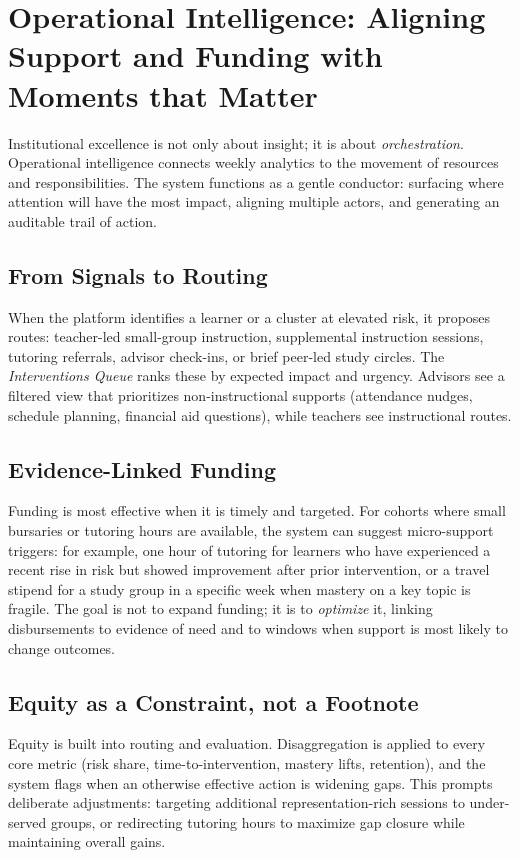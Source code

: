 \section{Operational Intelligence: Aligning Support and Funding with Moments that Matter}

Institutional excellence is not only about insight; it is about \emph{orchestration}. Operational intelligence connects weekly analytics to the movement of resources and responsibilities. The system functions as a gentle conductor: surfacing where attention will have the most impact, aligning multiple actors, and generating an auditable trail of action.

\subsection{From Signals to Routing}

When the platform identifies a learner or a cluster at elevated risk, it proposes routes: teacher-led small-group instruction, supplemental instruction sessions, tutoring referrals, advisor check-ins, or brief peer-led study circles. The \emph{Interventions Queue} ranks these by expected impact and urgency. Advisors see a filtered view that prioritizes non-instructional supports (attendance nudges, schedule planning, financial aid questions), while teachers see instructional routes.

\subsection{Evidence-Linked Funding}

Funding is most effective when it is timely and targeted. For cohorts where small bursaries or tutoring hours are available, the system can suggest micro-support triggers: for example, one hour of tutoring for learners who have experienced a recent rise in risk but showed improvement after prior intervention, or a travel stipend for a study group in a specific week when mastery on a key topic is fragile. The goal is not to expand funding; it is to \emph{optimize} it, linking disbursements to evidence of need and to windows when support is most likely to change outcomes.

\subsection{Equity as a Constraint, not a Footnote}

Equity is built into routing and evaluation. Disaggregation is applied to every core metric (risk share, time-to-intervention, mastery lifts, retention), and the system flags when an otherwise effective action is widening gaps. This prompts deliberate adjustments: targeting additional representation-rich sessions to under-served groups, or redirecting tutoring hours to maximize gap closure while maintaining overall gains.

